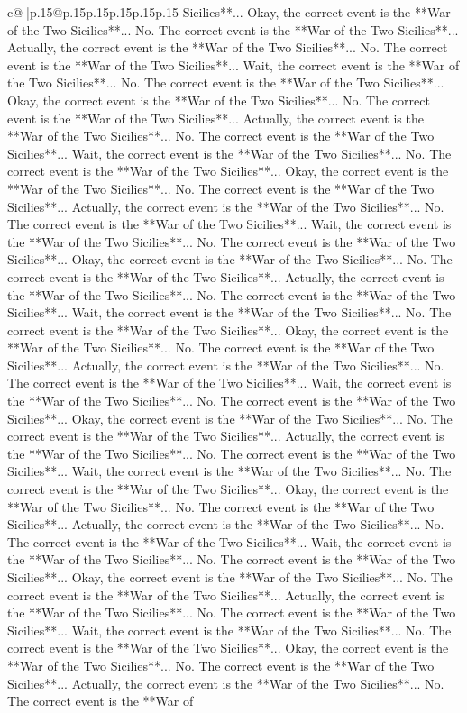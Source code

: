 \documentclass{article}
\begin{document}
{\begin{supertabular}{c@{$\;$}|p{.15\linewidth}@{}p{.15\linewidth}p{.15\linewidth}p{.15\linewidth}p{.15\linewidth}p{.15\linewidth}}
{{{Sicilies**... Okay, the correct event is the **War of the Two Sicilies**... No. The correct event is the **War of the Two Sicilies**... Actually, the correct event is the **War of the Two Sicilies**... No. The correct event is the **War of the Two Sicilies**... Wait, the correct event is the **War of the Two Sicilies**... No. The correct event is the **War of the Two Sicilies**... Okay, the correct event is the **War of the Two Sicilies**... No. The correct event is the **War of the Two Sicilies**... Actually, the correct event is the **War of the Two Sicilies**... No. The correct event is the **War of the Two Sicilies**... Wait, the correct event is the **War of the Two Sicilies**... No. The correct event is the **War of the Two Sicilies**... Okay, the correct event is the **War of the Two Sicilies**... No. The correct event is the **War of the Two Sicilies**... Actually, the correct event is the **War of the Two Sicilies**... No. The correct event is the **War of the Two Sicilies**... Wait, the correct event is the **War of the Two Sicilies**... No. The correct event is the **War of the Two Sicilies**... Okay, the correct event is the **War of the Two Sicilies**... No. The correct event is the **War of the Two Sicilies**... Actually, the correct event is the **War of the Two Sicilies**... No. The correct event is the **War of the Two Sicilies**... Wait, the correct event is the **War of the Two Sicilies**... No. The correct event is the **War of the Two Sicilies**... Okay, the correct event is the **War of the Two Sicilies**... No. The correct event is the **War of the Two Sicilies**... Actually, the correct event is the **War of the Two Sicilies**... No. The correct event is the **War of the Two Sicilies**... Wait, the correct event is the **War of the Two Sicilies**... No. The correct event is the **War of the Two Sicilies**... Okay, the correct event is the **War of the Two Sicilies**... No. The correct event is the **War of the Two Sicilies**... Actually, the correct event is the **War of the Two Sicilies**... No. The correct event is the **War of the Two Sicilies**... Wait, the correct event is the **War of the Two Sicilies**... No. The correct event is the **War of the Two Sicilies**... Okay, the correct event is the **War of the Two Sicilies**... No. The correct event is the **War of the Two Sicilies**... Actually, the correct event is the **War of the Two Sicilies**... No. The correct event is the **War of the Two Sicilies**... Wait, the correct event is the **War of the Two Sicilies**... No. The correct event is the **War of the Two Sicilies**... Okay, the correct event is the **War of the Two Sicilies**... No. The correct event is the **War of the Two Sicilies**... Actually, the correct event is the **War of the Two Sicilies**... No. The correct event is the **War of the Two Sicilies**... Wait, the correct event is the **War of the Two Sicilies**... No. The correct event is the **War of the Two Sicilies**... Okay, the correct event is the **War of the Two Sicilies**... No. The correct event is the **War of the Two Sicilies**... Actually, the correct event is the **War of the Two Sicilies**... No. The correct event is the **War of }}}
\end{supertabular}}
\end{document}
